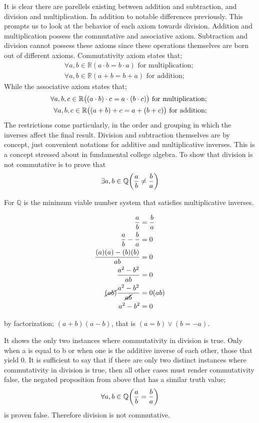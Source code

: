 \documentclass{article}
\newcommand{\paren}[1]{\mathopen{}\left( {#1}_{{}_{}}\,\negthickspace\right)\mathclose{}} %
\begin{document}
It is clear there are parellels existing between addition and subtraction, and division and multiplication. 
In addition to notable differences previously. This prompts us to look at the behavior of each 
axiom towards division. Addition and multiplication possess the commutative and associative axiom. Subtraction 
and division cannot possess these axioms since these operations themselves are born out of different axioms. 
Commutativity axiom states that;
\begin{align*}
    \forall a, b \in \mathbb{R} (a\cdot b = b \cdot a) \text{ for multiplication; } \\
    \forall a, b \in \mathbb{R} (a + b = b + a) \text{ for addition; } 
\end{align*} 
While the associative axiom states that;
\begin{align*}
    \forall a, b, c \in \mathbb{R} \paren{(a\cdot b) \cdot c = a \cdot (b \cdot c)} \text{ for multiplication; } \\
    \forall a, b, c \in \mathbb{R} \paren{(a + b) + c = a + (b + c)} \text{ for addition; } 
\end{align*} 
The restrictions come particularly, in the order and grouping in which the inverses affect the final result. 
Division and subtraction themselves are by concept, just convenient notations for additive and multiplicative inverses. This is a concept
stressed about in fundamental college algebra. To show that division is not commutative is to prove that
\[
    \exists a,b \in \mathbb {Q}\paren{\frac{a}{b}\neq\frac{b}{a}}
\]
\begin{center}
    For \(\mathbb{Q}\) is the minimum viable number system that satisfies multiplicative inverses.
\end{center}
\begin{align*}
    \frac{a}{b} &= \frac{b}{a} \\
    \frac{a}{b} - \frac{b}{a} &= 0\\
    \frac{(a)(a) - (b)(b)}{ab} &= 0 \\
    \frac{a^2- b^2}{ab} &= 0 \\
    \cancel{(ab)}\frac{a^2- b^2}{\cancel{ab}} &= 0 (ab)\\
    a^2-b^2 &= 0
\end{align*}
\begin{center}
    by factorization; \((a+b)(a-b)\), that is \((a = b) \lor (b = -a)\). 
\end{center}

It shows the only two instances where commutativity in division is true. Only when a is equal to b
or when one is the additive inverse of each other, those that yield 0. It is sufficient to say that 
if there are only two distinct instances where commutativity in division is true, then all other cases
must render commutativity false, the negated proposition from above that has a similar truth value;
\[
    \forall a,b \in \mathbb{Q}\paren{\frac{a}{b} = \frac{b}{a}} 
\]
is proven false. Therefore division is not commutative. 
\end{document}
